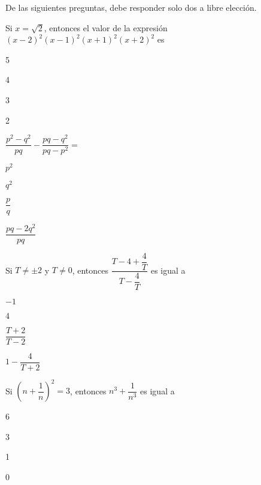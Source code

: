 \documentclass{sn-guia}
\begin{document}
\begin{preguntas}
    \begin{tcolorbox}[boxrule=1pt,colback=white,leftrule=3mm,grow to left by=-1cm,
        grow to right by=-1cm, enlarge top by=5mm, enlarge bottom by=0mm]
        De las siguientes preguntas, debe responder solo dos a libre elección.
    \end{tcolorbox}

    \pregunta Si $x=\sqrt{2}$, entonces el valor de la expresión 
    $(x-2)^2(x-1)^2(x+1)^2(x+2)^2$ es
    \begin{alternativas}[]
        \item 5
        \item 4
        \item 3
        \item 2
    \end{alternativas}

    \pregunta $\dfrac{p^2-q^2}{pq}-\dfrac{pq-q^2}{pq-p^2} =$
    \begin{alternativas}[]
        \item $p^2$
        \item $q^2$
        \item $\dfrac{p}{q}$
        \item $\dfrac{pq-2q^2}{pq}$
    \end{alternativas}

    \pregunta Si $T \neq \pm 2$ y $T \neq 0$, entonces 
    $\dfrac{T-4+\dfrac{4}{T}}{T - \dfrac{4}{T}}$ es igual a
    \begin{alternativas}[]
        \item $-1$
        \item $4$
        \item $\dfrac{T+2}{T-2}$
        \item $1 - \dfrac{4}{T+2}$
    \end{alternativas}

    \pregunta Si $\left( n + \dfrac{1}{n} \right)^2 = 3$, entonces $n^3 + \dfrac{1}{n^3}$
    es igual a
    \begin{alternativas}[]
        \item 6
        \item 3
        \item 1
        \item 0
    \end{alternativas}
\end{preguntas}
\end{document}
